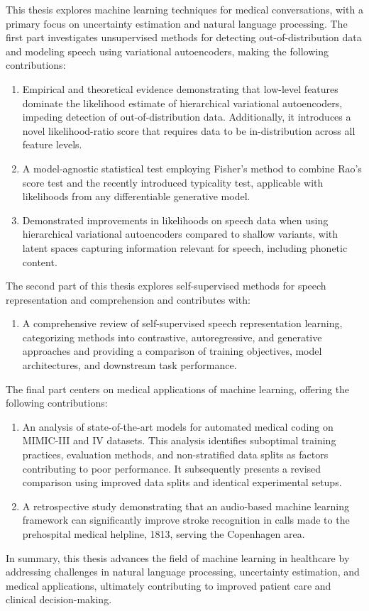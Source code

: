 This thesis explores machine learning techniques for medical conversations, with a primary focus on uncertainty estimation and natural language processing. The first part investigates unsupervised methods for detecting out-of-distribution data and modeling speech using variational autoencoders, making the following contributions:
%
\begin{enumerate}[label=(\roman*)] 
    \item Empirical and theoretical evidence demonstrating that low-level features dominate the likelihood estimate of hierarchical variational autoencoders, impeding detection of out-of-distribution data. Additionally, it introduces a novel likelihood-ratio score that requires data to be in-distribution across all feature levels.
    \item A model-agnostic statistical test employing Fisher's method to combine Rao's score test and the recently introduced typicality test, applicable with likelihoods from any differentiable generative model.
    \item Demonstrated improvements in likelihoods on speech data when using hierarchical variational autoencoders compared to shallow variants, with latent spaces capturing information relevant for speech, including phonetic content.
\end{enumerate}
%
The second part of this thesis explores self-supervised methods for speech representation and comprehension and contributes with:
%
\begin{enumerate}[resume, label=(\roman*)] 
    \item A comprehensive review of self-supervised speech representation learning, categorizing methods into contrastive, autoregressive, and generative approaches and providing a comparison of training objectives, model architectures, and downstream task performance.
\end{enumerate}
%
The final part centers on medical applications of machine learning, offering the following contributions:
%
\begin{enumerate}[resume, label=(\roman*)] 
    \item An analysis of state-of-the-art models for automated medical coding on MIMIC-III and IV datasets. This analysis identifies suboptimal training practices, evaluation methods, and non-stratified data splits as factors contributing to poor performance. It subsequently presents a revised comparison using improved data splits and identical experimental setups.
    \item A retrospective study demonstrating that an audio-based machine learning framework can significantly improve stroke recognition in calls made to the prehospital medical helpline, 1813, serving the Copenhagen area.
\end{enumerate}
%
In summary, this thesis advances the field of machine learning in healthcare by addressing challenges in natural language processing, uncertainty estimation, and medical applications, ultimately contributing to improved patient care and clinical decision-making.
